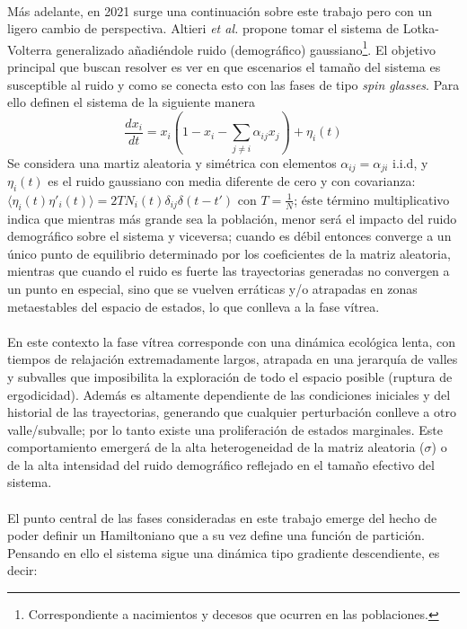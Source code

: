 \\
Más adelante, en 2021 surge una continuación sobre este trabajo pero con un ligero cambio de perspectiva. Altieri \textit{et al.} \cite{altieri2021properties} propone tomar el sistema de Lotka-Volterra generalizado añadiéndole ruido (demográfico) gaussiano\footnote{Correspondiente a nacimientos y decesos que ocurren en las poblaciones.}. El objetivo principal que buscan resolver es ver en que escenarios el tamaño del sistema es susceptible al ruido y como se conecta esto con las fases de tipo \textit{spin glasses}. Para ello definen el sistema de la siguiente manera
\begin{equation}\label{eqn:LKAltieri}
	\frac{dx_i}{dt}=x_i\left( 1-x_i-\sum_{j\neq i}\alpha_{ij}x_j\right )+\eta_i(t)
\end{equation}
Se considera una martiz aleatoria y simétrica con elementos $\alpha_{ij}=\alpha_{ji}$ i.i.d, y $\eta_i(t)$ es el ruido gaussiano con media diferente de cero y con covarianza: $\langle \eta_i(t)\eta'_i(t)\rangle=2TN_i(t)\delta_{ij}\delta(t-t')$ con $T=\frac{1}{N}$; éste término multiplicativo indica que mientras más grande sea la población, menor será el impacto del ruido demográfico sobre el sistema y viceversa; cuando es débil entonces converge a un único punto de equilibrio determinado por los coeficientes de la matriz aleatoria, mientras que cuando el ruido es fuerte las trayectorias generadas no convergen a un punto en especial, sino que se vuelven erráticas y/o atrapadas en zonas metaestables del espacio de estados, lo que conlleva a la fase vítrea.\\
\\
En este contexto la fase vítrea corresponde con una dinámica ecológica lenta, con tiempos de relajación extremadamente largos, atrapada en una jerarquía de valles y subvalles que imposibilita la exploración de todo el espacio posible (ruptura de ergodicidad). Además es altamente dependiente de las condiciones iniciales y del historial de las trayectorias, generando que cualquier perturbación conlleve a otro valle/subvalle; por lo tanto existe una proliferación de estados marginales. Este comportamiento emergerá de la alta heterogeneidad de la matriz aleatoria ($\sigma$) o de la alta intensidad del ruido demográfico reflejado en el tamaño efectivo del sistema.\\
\\
El punto central de las fases consideradas en este trabajo emerge del hecho de poder definir un Hamiltoniano que a su vez define una función de partición. Pensando en ello el sistema sigue una dinámica tipo gradiente descendiente, es decir:
